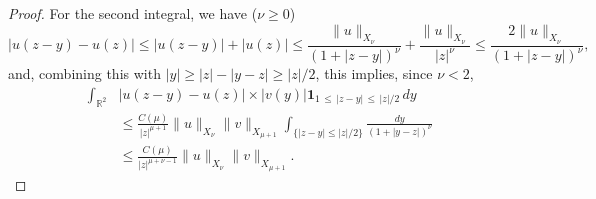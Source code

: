 \documentclass[10pt]{amsart}
\theoremstyle{definition}\newtheorem{defi}[theo]{Definition}\newtheorem{rema}[theo]{Remark}\newtheorem{exam}[theo]{Example}\newtheorem{exem}[theo]{Example}\newtheorem{nota}[theo]{Notation}
\newcommand*\R{\mathbb R}
\newcommand{\bfun}{\mathbf{1}}
\newcommand*\gs{\geqslant }
\newcommand*\ls{\leqslant }
\begin{document}
\begin{proof}
For the second integral, we have ($\nu \gs 0 $)
\[
\lvert u (z-y) - u (z) \rvert
\ls \lvert u (z-y) \rvert + \lvert u (z) \rvert
\ls \frac{ \| u \|_{X_\nu} }{ (1 + |z-y|)^\nu } + \frac{\| u \|_{X_\nu} }{ |z|^\nu }
\ls \frac{2\| u \|_{X_\nu}}{ (1+ |z-y|)^\nu },
\]
and, combining this with $|y| \gs |z| - |y-z| \gs |z| /2 $, this implies, since $ \nu < 2 $,
\begin{align*}
\int_{\R^2} & \lvert u (z-y) - u (z) \rvert \times \lvert v(y) \rvert \bfun_{ 1\,\ls\,|z-y| \,\ls\,|z|/2 } \, dy
\\ & \ls \frac{C(\mu) }{ |z|^{\mu+1} } \| u \|_{X_\nu} \| v \|_{ X_{\mu+1} }
\int_{ \{ |z-y| \ls |z|/2 \} } \frac{dy}{ (1 + |y -z|)^\nu }
\\
& \ls \frac{C(\mu)}{ |z|^{ \mu + \nu - 1 } } \| u \|_{X_\nu} \| v \|_{ X_{\mu+1}}.
\end{align*}


\end{proof}
\end{document}
